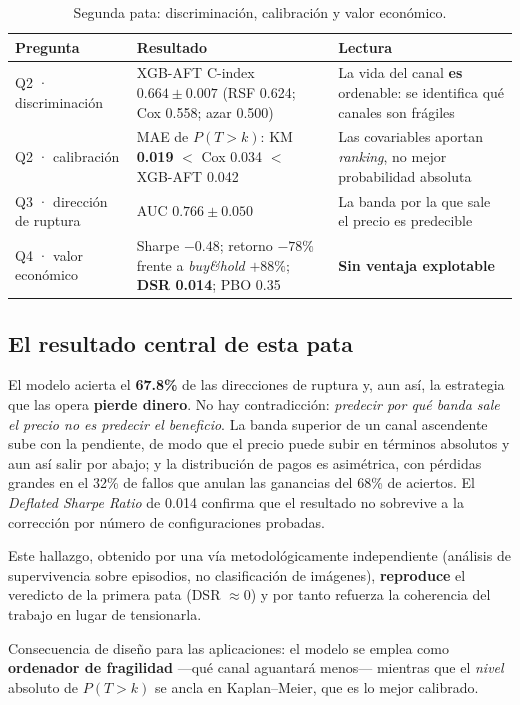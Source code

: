 \documentclass[11pt,a4paper]{article}
\begin{document}
\begin{table}[H]
\centering
\footnotesize
\caption{Segunda pata: discriminación, calibración y valor económico.}
\label{tab:parte2}
\begin{tabularx}{\textwidth}{p{3.5cm}p{4.4cm}L}
\toprule
\textbf{Pregunta} & \textbf{Resultado} & \textbf{Lectura} \\
\midrule
Q2 · discriminación & XGB-AFT C-index $\mathbf{0.664 \pm 0.007}$ (RSF 0.624; Cox 0.558; azar 0.500) &
La vida del canal \textbf{es} ordenable: se identifica qué canales son frágiles \\
Q2 · calibración & MAE de $P(T{>}k)$: KM \textbf{0.019} $<$ Cox 0.034 $<$ XGB-AFT 0.042 &
Las covariables aportan \emph{ranking}, no mejor probabilidad absoluta \\
Q3 · dirección de ruptura & AUC $\mathbf{0.766 \pm 0.050}$ &
La banda por la que sale el precio es predecible \\
Q4 · valor económico & Sharpe $-0.48$; retorno $-78\%$ frente a \emph{buy\&hold} $+88\%$; \textbf{DSR 0.014}; PBO 0.35 &
\textbf{Sin ventaja explotable} \\
\bottomrule
\end{tabularx}
\end{table}

\subsection{El resultado central de esta pata}
El modelo acierta el \textbf{67.8\%} de las direcciones de ruptura y, aun así, la
estrategia que las opera \textbf{pierde dinero}. No hay contradicción:
\emph{predecir por qué banda sale el precio no es predecir el beneficio}. La
banda superior de un canal ascendente sube con la pendiente, de modo que el
precio puede subir en términos absolutos y aun así salir por abajo; y la
distribución de pagos es asimétrica, con pérdidas grandes en el 32\% de fallos
que anulan las ganancias del 68\% de aciertos. El \emph{Deflated Sharpe Ratio} de
0.014 confirma que el resultado no sobrevive a la corrección por número de
configuraciones probadas.

Este hallazgo, obtenido por una vía metodológicamente independiente (análisis de
supervivencia sobre episodios, no clasificación de imágenes), \textbf{reproduce}
el veredicto de la primera pata (DSR $\approx 0$) y por tanto refuerza la
coherencia del trabajo en lugar de tensionarla.

Consecuencia de diseño para las aplicaciones: el modelo se emplea como
\textbf{ordenador de fragilidad} —qué canal aguantará menos— mientras que el
\emph{nivel} absoluto de $P(T>k)$ se ancla en Kaplan--Meier, que es lo mejor
calibrado.
\end{document}
